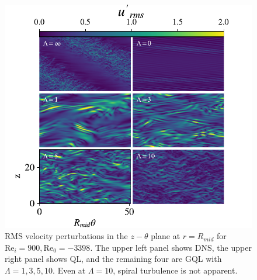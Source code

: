 \documentclass[openacc]{rstransa}%
\newcommand{\Reyn}{\mathrm{Re}}
\begin{document}
\begin{figure}
    \centering
    \includegraphics[width=\textwidth]{figs/rei900_snapshots.pdf}
    \caption{RMS velocity perturbations in the $z-\theta$ plane at $r=R_{mid}$ for $\Reyn_i=900, \Reyn_0=-3398$. The upper left panel shows DNS, the upper right panel shows QL, and the remaining four are GQL with $\Lambda = 1,3,5,10$. Even at $\Lambda = 10$, spiral turbulence is not apparent.}
    \label{fig:rei900_snapshots}
\end{figure}
\end{document}
